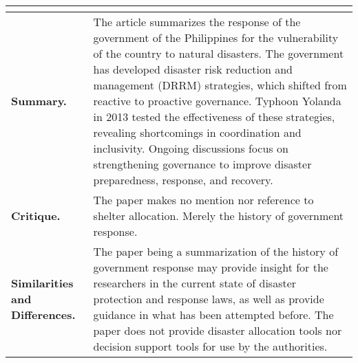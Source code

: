 \begin{longtable}{|L{.2\linewidth}|L{.74\linewidth}|}
	\hline
	\\ \hline
	\textbf{Summary.} & The article summarizes the response of the government of the Philippines for the vulnerability of the country to natural disasters. The government has developed disaster risk reduction and management (DRRM) strategies, which shifted from reactive to proactive governance. Typhoon Yolanda in 2013 tested the effectiveness of these strategies, revealing shortcomings in coordination and inclusivity. Ongoing discussions focus on strengthening governance to improve disaster preparedness, response, and recovery.\\ \hline
	\textbf{Critique.} & The paper makes no mention nor reference to shelter allocation. Merely the history of government response.\\ \hline
	\textbf{Similarities and Differences.} & The paper being a summarization of the history of government response may provide insight for the researchers in the current state of disaster protection and response laws, as well as provide guidance in what has been attempted before. The paper does not provide disaster allocation tools nor decision support tools for use by the authorities.\\ \hline
\end{longtable}